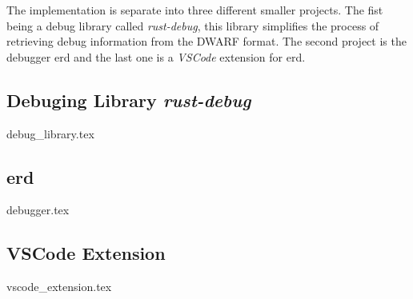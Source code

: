  

The implementation is separate into three different smaller projects.
The fist being a debug library called \emph{rust-debug}, this library simplifies the process of retrieving debug information from the \gls{DWARF} format.
The second project is the debugger \gls{erd} and the last one is a \emph{VSCode} extension for \gls{erd}.


\subsection{Debuging Library \emph{rust-debug}}
\label{subsection:rust-debug}
{debug_library.tex}


\subsection{\acrfull{erd}}
{debugger.tex}


\subsection{VSCode Extension}
{vscode_extension.tex}

